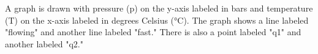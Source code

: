 A graph is drawn with pressure (p) on the y-axis labeled in bars and temperature (T) on the x-axis labeled in degrees Celsius (°C). The graph shows a line labeled "flowing" and another line labeled "fast." There is also a point labeled "q1" and another labeled "q2."